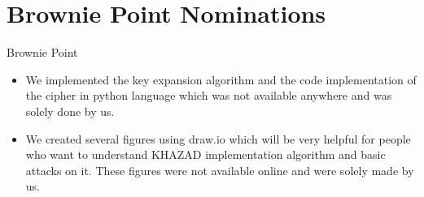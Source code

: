 \section{Brownie Point Nominations}

\begin{frame}{Brownie Point}
    \begin{itemize}
        \item We implemented the key expansion algorithm and the code implementation of the cipher in python language which was not available anywhere and was solely done by us.
        \item We created several figures using draw.io which will be very helpful for people who want to understand KHAZAD implementation algorithm and basic attacks on it. These figures were not available online and were solely made by us.
    \end{itemize}
\end{frame}